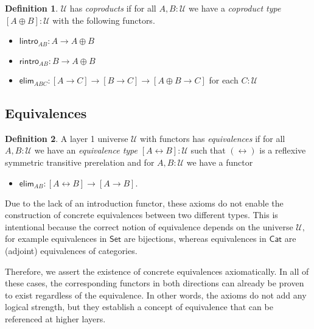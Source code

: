 \documentclass[a4paper]{article}
\theoremstyle{definition}
\newtheorem{definition}{Definition}[section]
\theoremstyle{remark}
\newcommand{\defn}{\emph}
\newcommand{\U}{\mathcal{U}}
\newcommand{\nm}{\mathsf}
\newcommand{\universe}{\nm}
\newcommand{\Set}{\universe{Set}}
\newcommand{\Cat}{\universe{Cat}}
\newcommand{\elim}{\nm{elim}}
\begin{document}
\begin{definition}
  $\U$ has \defn{coproducts} if for all $A,B : \U$ we have a \defn{coproduct type}
  $[A \oplus B] : \U$ with the following functors.
  \begin{itemize}
    \item $\nm{lintro}_{AB} : A \to A \oplus B$
    \item $\nm{rintro}_{AB} : B \to A \oplus B$
    \item $\elim_{ABC} : [A \to C] \to [B \to C] \to [A \oplus B \to C]$ for each $C : \U$
  \end{itemize}
\end{definition}

\subsection{Equivalences}
\label{sec:layer1-equivalences}

\begin{definition}
  A layer 1 universe $\U$ with functors has \defn{equivalences} if for all $A,B : \U$ we have an
  \defn{equivalence type} $[A \leftrightarrow B] : \U$ such that $(\leftrightarrow)$ is a reflexive
  symmetric transitive prerelation and for $A,B : \U$ we have a functor
  \begin{itemize}
    \item $\elim_{AB} : [A \leftrightarrow B] \to [A \to B].$
  \end{itemize}
\end{definition}

Due to the lack of an introduction functor, these axioms do not enable the construction of concrete
equivalences between two different types. This is intentional because the correct notion of
equivalence depends on the universe $\U,$ for example equivalences in $\Set$ are bijections, whereas
equivalences in $\Cat$ are (adjoint) equivalences of categories.

Therefore, we assert the existence of concrete equivalences axiomatically. In all of these cases,
the corresponding functors in both directions can already be proven to exist regardless of the
equivalence. In other words, the axioms do not add any logical strength, but they establish a
concept of equivalence that can be referenced at higher layers.
\end{document}
